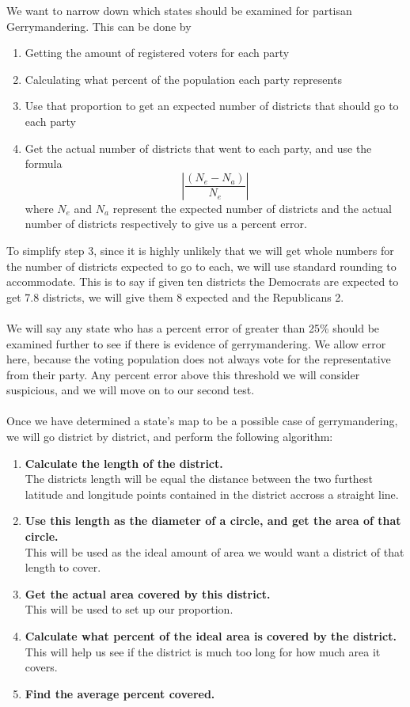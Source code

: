 \documentclass[12pt]{article}
\begin{document}
	\noindent
	We want to narrow down which states should be examined for partisan Gerrymandering.  This can be done by 
	\begin{enumerate}
		\item Getting the amount of registered voters for each party
		\item Calculating what percent of the population each party represents
		\item Use that proportion to get an expected number of districts that should go to each party
		\item Get the actual number of districts that went to each party, and use the formula \[\left|\frac{(N_e - N_a)}{N_e}\right|\] where $N_e$ and $N_a$ represent the expected number of districts and the actual number of districts respectively to give us a percent error.
	\end{enumerate}
	To simplify step 3, since it is highly unlikely that we will get whole numbers for the number of districts expected to go to each, we will use standard rounding to accommodate. This is to say if given ten districts the Democrats are expected to get 7.8 districts, we will give them 8 expected and the Republicans 2.
	\\
	\\We will say any state who has a percent error of greater than 25\% should be examined further to see if there is evidence of gerrymandering.  We allow error here, because the voting population does not always vote for the representative from their party.  Any percent error above this threshold we will consider suspicious, and we will move on to our second test.
	\\
	\\Once we have determined a state's map to be a possible case of gerrymandering, we will go district by district, and perform the following algorithm:
	\begin{enumerate}
		\item \textbf{Calculate the length of the district.}
		\\The districts length will be equal the distance between the two furthest latitude and longitude points contained in the district accross a straight line.
		\item \textbf{Use this length as the diameter of a circle, and get the area of that circle.}
		\\This will be used as the ideal amount of area we would want a district of that length to cover.
		\item \textbf{Get the actual area covered by this district.}
		\\This will be used to set up our proportion.
		\item\textbf{Calculate what percent of the ideal area is covered by the district.}
		\\This will help us see if the district is much too long for how much area it covers.
		\item\textbf{Find the average percent covered.}
	\end{enumerate} 
\end{document}
